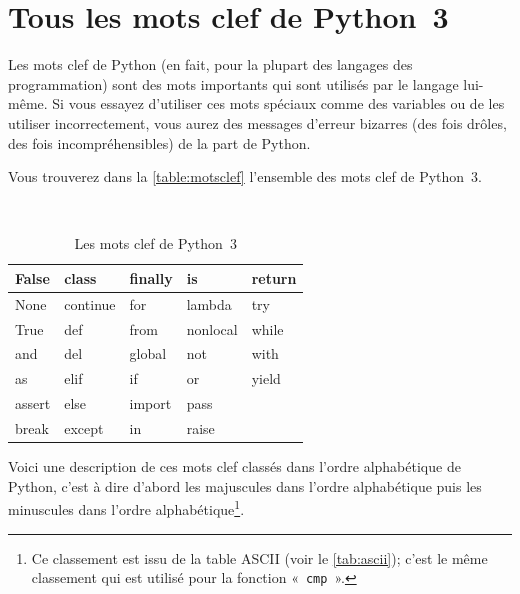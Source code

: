 




\chapter{Tous les mots clef de Python 3}\label{app:motsclef}

Les mots clef de Python (en fait, pour la plupart des langages des programmation) sont des mots importants qui sont utilisés par le langage lui-même. Si vous essayez d'utiliser ces mots spéciaux comme des variables ou de les utiliser incorrectement, vous aurez des messages d'erreur bizarres (des fois drôles, des fois incompréhensibles) de la part de Python. 

Vous trouverez dans la \autoref{table:motsclef} l'ensemble des mots clef de Python 3.

\begin{table}[h!]
\tt
\centering
\begin{tabular}{|l|l|l|l|l|}
\hline False &   class  &    finally &   is    &     return  \\ 
\hline  None   &    continue &  for &       lambda &    try  \\ 
\hline  True  &     def  &      from  &     nonlocal  & while  \\ 
\hline  and    &    del   &     global &    not   &     with \\ 
\hline  as    &     elif  &     if   &      or   &      yield  \\ 
\hline  assert  &   else   &    import   &  pass  & \\ 
\hline  break &      except   &  in    &     raise  &\\ 
\hline 
\end{tabular} 
\rm
\caption{Les mots clef de Python 3}\label{table:motsclef}
\end{table}

Voici une description de ces mots clef classés dans l'ordre alphabétique  de Python, c'est à dire d'abord les majuscules dans l'ordre alphabétique puis les minuscules dans l'ordre alphabétique\footnote{Ce classement est issu de la table ASCII (voir le \autoref{tab:ascii}); c'est le même classement qui est utilisé pour la fonction « \texttt{cmp} ».}. 

